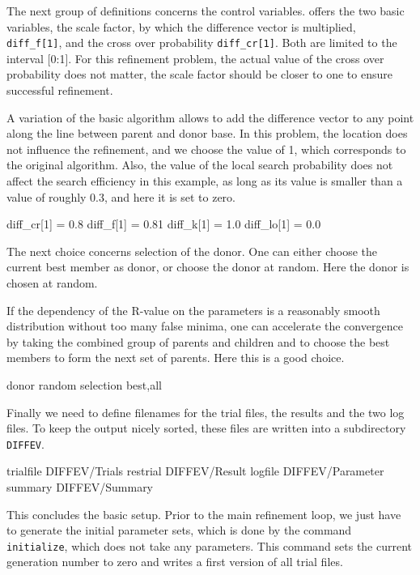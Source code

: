 The next group of definitions concerns the control variables. \Diffev
offers the two basic variables, the scale factor, by which the difference
vector is multiplied, {\tt diff\_f[1]}, and the cross over probability
{\tt diff\_cr[1]}. Both are limited to the interval [0:1]. For this
refinement problem, the actual value of the cross over probability does
not matter, the scale factor should be closer to one to ensure 
successful refinement.

A variation of the basic algorithm allows to add the difference vector to 
any point along the line between parent and donor base.
In this problem, the location does not influence the refinement, and 
we choose the value of 1, which corresponds to the original 
algorithm. Also, the value of the local search probability does not
affect the search efficiency in this example, as long as its value is 
smaller than a value of roughly 0.3, and here it is set to zero.

\begin{MacVerbatim}
   diff_cr[1]  = 0.8
   diff_f[1]   = 0.81
   diff_k[1]   = 1.0
   diff_lo[1]  = 0.0
\end{MacVerbatim}

The next choice concerns selection of the donor. One can either choose 
the current best member as donor, or choose the donor at random. 
Here the donor is chosen at random. 

If the dependency of the R-value on the parameters is a reasonably 
smooth distribution without too many false minima, one can accelerate 
the convergence by taking the combined group of parents and children 
and to choose the best members to form the next set of parents. 
Here this is a good choice.

\begin{MacVerbatim}
   donor      random
   selection  best,all
\end{MacVerbatim}

Finally we need to define filenames for the trial files, the results
and the two log files. To keep the output nicely sorted, these files
are written into a subdirectory {\tt DIFFEV}.

\begin{MacVerbatim}
   trialfile  DIFFEV/Trials
   restrial   DIFFEV/Result
   logfile    DIFFEV/Parameter
   summary    DIFFEV/Summary
\end{MacVerbatim}

This concludes the basic setup. Prior to the main refinement loop, we
just have to generate the initial parameter sets, which is done by
the command {\tt initialize}, which does not take any parameters.
This command sets the current generation number to zero and writes
a first version of all trial files.

